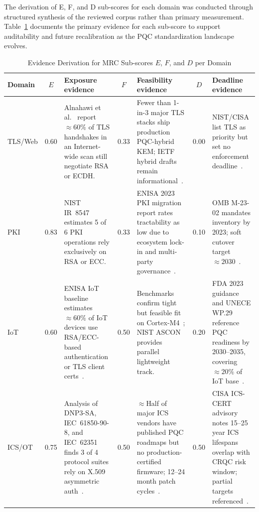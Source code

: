 \documentclass[journal]{IEEEtran}
\begin{document}
The derivation of E, F, and D sub-scores for each domain was conducted
through structured synthesis of the reviewed corpus rather than primary
measurement. Table~\ref{tab:mrc_derivation} documents the primary
evidence for each sub-score to support auditability and future
recalibration as the PQC standardization landscape evolves.

\begin{table}[!t]
\caption{Evidence Derivation for MRC Sub-scores $E$, $F$, and $D$ per Domain}
\label{tab:mrc_derivation}
\centering
\renewcommand{\arraystretch}{1.25}
\footnotesize
\begin{tabular}{@{}p{1.5cm}cp{3.6cm}cp{3.6cm}cp{3.6cm}@{}}
\toprule
\textbf{Domain} & $E$ & \textbf{Exposure evidence} & $F$ & \textbf{Feasibility evidence} & $D$ & \textbf{Deadline evidence} \\
\midrule
TLS/Web   & 0.60 & Alnahawi et al.~\cite{alnahawi2024comprehensive} report ${\approx}60\%$ of TLS handshakes in an Internet-wide scan still negotiate RSA or ECDH. & 0.33 & Fewer than 1-in-3 major TLS stacks ship production PQC-hybrid KEM; IETF hybrid drafts remain informational~\cite{ietf2024hybridkem}. & 0.00 & NIST/CISA list TLS as priority but set no enforcement deadline~\cite{cisa2023pqc}. \\
\addlinespace
PKI       & 0.83 & NIST IR~8547~\cite{nistir8547} estimates 5 of 6 PKI operations rely exclusively on RSA or ECC. & 0.33 & ENISA 2023 PKI migration report rates tractability as low due to ecosystem lock-in and multi-party governance~\cite{enisa2022pqc}. & 0.10 & OMB M-23-02 mandates inventory by 2023; soft cutover target ${\approx}2030$~\cite{omb2023m2302}. \\
\addlinespace
IoT       & 0.60 & ENISA IoT baseline estimates ${\approx}60\%$ of IoT devices use RSA/ECC-based authentication or TLS client certs~\cite{enisa2022pqc}. & 0.50 & Benchmarks confirm tight but feasible fit on Cortex-M4~\cite{kannwischer2019pqm4}; NIST ASCON provides parallel lightweight track. & 0.20 & FDA 2023 guidance and UNECE WP.29 reference PQC readiness by 2030--2035, covering ${\approx}20\%$ of IoT base~\cite{omb2023m2302}. \\
\addlinespace
ICS/OT    & 0.75 & Analysis of DNP3-SA, IEC~61850-90-8, and IEC~62351 finds 3 of 4 protocol suites rely on X.509 asymmetric auth~\cite{olivamoral2024cybersecurity}. & 0.50 & ${\approx}$Half of major ICS vendors have published PQC roadmaps but no production-certified firmware; 12--24 month patch cycles~\cite{olivamoral2024cybersecurity}. & 0.50 & CISA ICS-CERT advisory notes 15--25 year ICS lifespans overlap with CRQC risk window; partial targets referenced~\cite{cisa2023pqc}. \\

\end{tabular}
\end{table}
\end{document}
